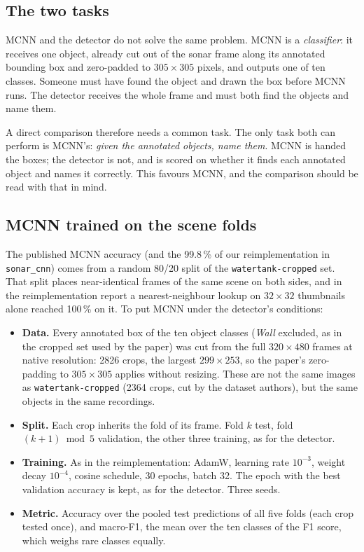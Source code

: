\documentclass[11pt,a4paper]{article}
\begin{document}
\subsection{The two tasks}

MCNN and the detector do not solve the same problem. MCNN is a
\emph{classifier}: it receives one object, already cut out of the sonar
frame along its annotated bounding box and zero-padded to $305 \times 305$
pixels, and outputs one of ten classes. Someone must have found the object
and drawn the box before MCNN runs. The detector receives the whole frame
and must both find the objects and name them.

A direct comparison therefore needs a common task. The only task both can
perform is MCNN's: \emph{given the annotated objects, name them}. MCNN is
handed the boxes; the detector is not, and is scored on whether it finds
each annotated object and names it correctly. This favours MCNN, and the
comparison should be read with that in mind.

\subsection{MCNN trained on the scene folds}

The published MCNN accuracy (and the 99.8\,\% of our reimplementation in
\texttt{sonar\_cnn}) comes from a random 80/20 split of the
\texttt{watertank-cropped} set. That split places near-identical frames of
the same scene on both sides, and in the reimplementation report a
nearest-neighbour lookup on $32 \times 32$ thumbnails alone reached 100\,\%
on it. To put MCNN under the detector's conditions:

\begin{itemize}
  \item \textbf{Data.} Every annotated box of the ten object classes
        (\emph{Wall} excluded, as in the cropped set used by the paper) was
        cut from the full $320 \times 480$ frames at native resolution: \num{2826}
        crops, the largest $299 \times 253$, so the paper's zero-padding to
        $305 \times 305$ applies without resizing. These are not the same
        images as \texttt{watertank-cropped} (\num{2364} crops, cut by the
        dataset authors), but the same objects in the same recordings.
  \item \textbf{Split.} Each crop inherits the fold of its frame. Fold $k$
        test, fold $(k+1) \bmod 5$ validation, the other three training,
        as for the detector.
  \item \textbf{Training.} As in the reimplementation: AdamW, learning rate
        $10^{-3}$, weight decay $10^{-4}$, cosine schedule, 30 epochs,
        batch 32. The epoch with the best validation accuracy is kept, as for
        the detector. Three seeds.
  \item \textbf{Metric.} Accuracy over the pooled test predictions of all
        five folds (each crop tested once), and macro-F1, the mean over the
        ten classes of the F1 score, which weighs rare classes equally.
\end{itemize}
\end{document}
